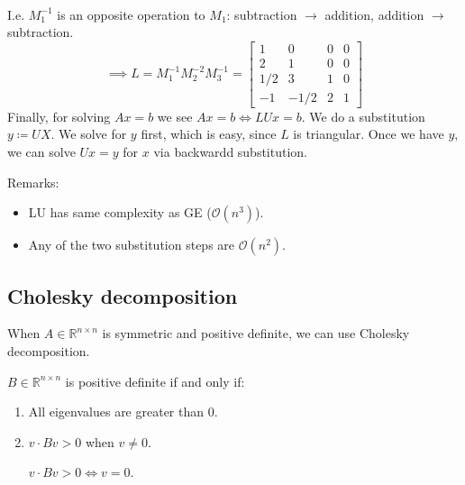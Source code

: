 \begin{example}
\begin{align*}
    \end{align*}
    I.e. $M_1^{-1}$ is an opposite operation to $M_1$:
    subtraction $\to$ addition, addition $\to$ subtraction.
    \[
        \implies L = M_1^{-1} M_2^{-2} M_3^{-1} =
        \begin{bmatrix}
            1 & 0 & 0 & 0\\
            2 & 1 & 0 & 0\\
            1/2 & 3 & 1 & 0\\
            -1 & -1/2 & 2 & 1
        \end{bmatrix}
    \]
    Finally, for solving $Ax = b$ we see
    $Ax = b \Longleftrightarrow LUx = b$.
    We do a substitution $y \coloneqq UX$.
    We solve for $y$ first, which is easy, since $L$ is triangular.
    Once we have $y$, we can solve $Ux = y$ for $x$ via backwardd substitution.
\end{example}

Remarks:
\begin{itemize}
    \item {
        LU has same complexity as GE ($\mathcal{O}(n^3)$).
    }
    \item {
        Any of the two substitution steps are $\mathcal{O}(n^2)$.
    }
\end{itemize}

\subsection{Cholesky decomposition}
When $A \in \mathbb{R}^{n \times n}$ is symmetric and positive definite,
we can use Cholesky decomposition.

\begin{definition}
    $B \in \mathbb{R}^{n \times n}$ is positive definite if and only if:
    \begin{enumerate}
        \item {
            All eigenvalues are greater than 0.
        }
        \item {
            $v \cdot Bv > 0$ when $v \ne 0$.

            $v \cdot Bv > 0 \Longleftrightarrow v = 0$.
        }
    \end{enumerate}
\end{definition}